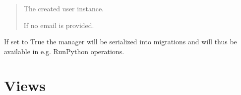 \documentclass[letterpaper,10pt,english]{sphinxmanual}
\begin{document}
\begin{fulllineitems}
\begin{fulllineitems}
\begin{quote}
\begin{description}
\begin{itemize}
\end{itemize}

\sphinxAtStartPar
The created user instance.

\sphinxAtStartPar
{\hyperref[\detokenize{users:users.models.CustomUser}]{}}

\sphinxAtStartPar
{} \textendash{} If no email is provided.

\end{description}\end{quote}

\end{fulllineitems}


\begin{fulllineitems}
\label{\detokenize{users:users.models.CustomUserManager.use_in_migrations}}
\pysigstartsignatures
\pysigline
{}
\pysigstopsignatures
\sphinxAtStartPar
If set to True the manager will be serialized into migrations and will
thus be available in e.g. RunPython operations.

\end{fulllineitems}


\end{fulllineitems}



\section{Views}
\label{\detokenize{users:module-users.views}}\label{\detokenize{users:views}}
\end{document}
